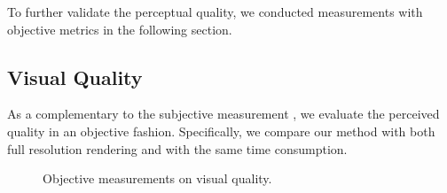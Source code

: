 To further validate the perceptual quality, we conducted measurements with objective metrics in the following section.

\subsection{Visual Quality}
As a complementary to the subjective measurement , we evaluate the perceived quality in an objective fashion. Specifically, we compare our method with both full resolution rendering and \cite{mildenhall2020nerf} with the same time consumption.

\begin{figure}
    \centering

    \caption{Objective measurements on visual quality.}
    \label{fig:result:visual}
\end{figure}

